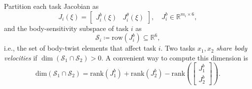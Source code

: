 \documentclass[../main.tex]{subfiles}
\begin{document}




\begin{definition}
Partition each task Jacobian as %
\begin{equation}
    J_i(\xi) = \begin{bmatrix} J_i^{b}(\xi) & J_i^{\theta}(\xi)\end{bmatrix},
    \quad J_i^{b}\in\mathbb{R}^{m_i\times 6},
\end{equation}
and the body-sensitivity subspace of task \(i\) as
\begin{equation}
    \mathcal S_i \coloneqq \mathrm{row}(J_i^{b}) \subseteq \mathbb{R}^6,
\end{equation}
i.e., the set of body-twist elements that affect task $i$.
Two tasks $x_1,x_2$ \emph{share body velocities} if
$\dim(\mathcal{S}_1\cap\mathcal{S}_2)>0$.
A convenient way to compute this dimension is
\begin{equation}
\label{eq:shared-dim}
    \mathrm{dim}(\mathcal{S}_1\cap\mathcal{S}_2)
    =\mathrm{rank}(J_1^b)+\mathrm{rank}(J_2^b)-
    \mathrm{rank}\left(\begin{bmatrix}J_1^b\\ J_2^b\end{bmatrix}\right).
\end{equation}
\end{definition}
\end{document}
